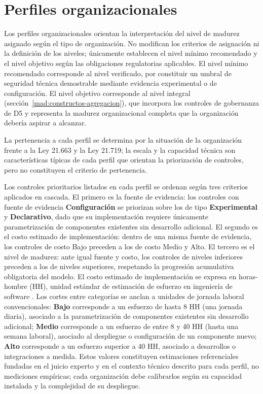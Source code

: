\chapter{Perfiles organizacionales}
\label{ch:perfiles}

Los perfiles organizacionales orientan la interpretación del nivel de madurez asignado según el tipo de organización. No modifican los criterios de asignación ni la definición de los niveles; únicamente establecen el nivel mínimo recomendado y el nivel objetivo según las obligaciones regulatorias aplicables. El nivel mínimo recomendado corresponde al nivel verificado, por constituir un umbral de seguridad técnica demostrable mediante evidencia experimental o de configuración. El nivel objetivo corresponde al nivel integral (sección~\ref{mad:constructos-agregacion}), que incorpora los controles de gobernanza de D5 y representa la madurez organizacional completa que la organización debería aspirar a alcanzar.

La pertenencia a cada perfil se determina por la situación de la organización frente a la Ley 21.663 y la Ley 21.719; la escala y la capacidad técnica son características típicas de cada perfil que orientan la priorización de controles, pero no constituyen el criterio de pertenencia.

Los controles prioritarios listados en cada perfil se ordenan según tres criterios aplicados en cascada. El primero es la fuente de evidencia: los controles con fuente de evidencia \textbf{Configuración} se priorizan sobre los de tipo \textbf{Experimental} y \textbf{Declarativo}, dado que su implementación requiere únicamente parametrización de componentes existentes sin desarrollo adicional. El segundo es el costo estimado de implementación: dentro de una misma fuente de evidencia, los controles de costo Bajo preceden a los de costo Medio y Alto. El tercero es el nivel de madurez: ante igual fuente y costo, los controles de niveles inferiores preceden a los de niveles superiores, respetando la progresión acumulativa obligatoria del modelo. El costo estimado de implementación se expresa en horas-hombre (HH), unidad estándar de estimación de esfuerzo en ingeniería de software \cite{cocomo2}. Los cortes entre categorías se anclan a unidades de jornada laboral convencionales: \textbf{Bajo} corresponde a un esfuerzo de hasta 8 HH (una jornada diaria), asociado a la parametrización de componentes existentes sin desarrollo adicional; \textbf{Medio} corresponde a un esfuerzo de entre 8 y 40 HH (hasta una semana laboral), asociado al despliegue o configuración de un componente nuevo; \textbf{Alto} corresponde a un esfuerzo superior a 40 HH, asociado a desarrollos o integraciones a medida. Estos valores constituyen estimaciones referenciales fundadas en el juicio experto y en el contexto técnico descrito para cada perfil, no mediciones empíricas; cada organización debe calibrarlos según su capacidad instalada y la complejidad de su despliegue.


